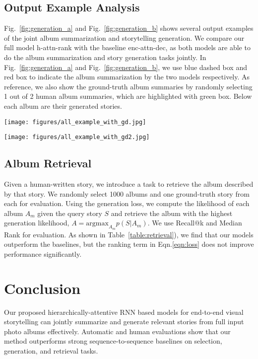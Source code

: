 \vspace{-0.2cm}
\subsection{Output Example Analysis}
Fig.~\ref{fig:generation_a} and Fig.~\ref{fig:generation_b} shows several output examples of the joint album summarization and storytelling generation.
We compare our full model h-attn-rank with the baseline enc-attn-dec, as both models are able to do the album summarization and story generation tasks jointly.
In Fig.~\ref{fig:generation_a} and Fig.~\ref{fig:generation_b}, we use blue dashed box and red box to indicate the album summarization by the two models respectively.
As reference, we also show the ground-truth album summaries by randomly selecting 1 out of 2 human album summaries, which are highlighted with green box.
Below each album are their generated stories.

\begin{figure*}[t!]
\centering
\texttt{[image: figures/all\_example\_with\_gd.jpg]}
\caption{Examples of album summarization and storytelling by enc-attn-dec (blue), h-attn-rank (red), and ground-truth (green). We randomly select 1 out of 2 human album summaries as ground-truth here.}
\label{fig:generation_a}
\end{figure*}

\begin{figure*}[t!]
\centering
\texttt{[image: figures/all\_example\_with\_gd2.jpg]}
\caption{More examples of album summarization and storytelling by enc-attn-dec (blue), h-attn-rank (red), and ground-truth (green). We randomly select 1 out of 2 human album summaries as ground-truth here.}
\label{fig:generation_b}
\end{figure*}


\subsection{Album Retrieval}
Given a human-written story, we introduce a task to retrieve the album described by that story. 
We randomly select 1000 albums and one ground-truth story from each for evaluation. 
Using the generation loss, we compute the likelihood of each album $A_m$ given the query story $S$ and retrieve the album with the highest generation likelihood, $A = \mbox{argmax}_{A_m} p(S|A_m)$.
We use Recall@k and Median Rank for evaluation.
As shown in Table~\ref{table:retrieval}), we find that our models outperform the baselines, but the ranking term in Eqn.\ref{eqn:loss} does not improve performance significantly.

\section{Conclusion}
\vspace{-0.3cm}
Our proposed hierarchically-attentive RNN based models for end-to-end visual storytelling can jointly summarize and generate relevant stories from full input photo albums effectively. Automatic and human evaluations show that our method outperforms strong sequence-to-sequence baselines on selection, generation, and retrieval tasks.

